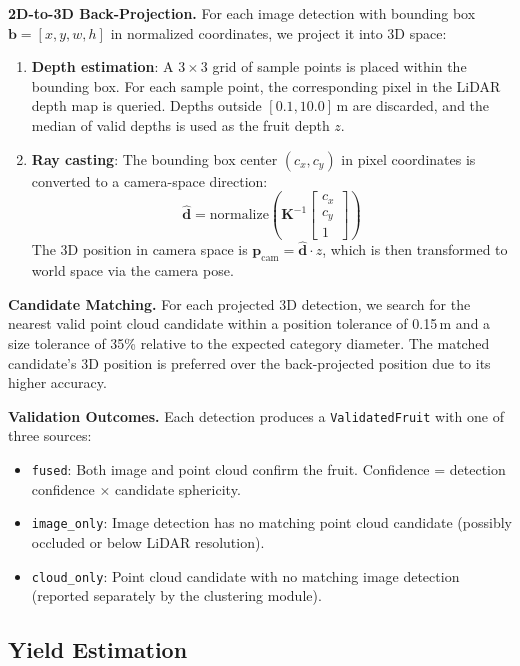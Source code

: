 \documentclass[article,final]{iclr2024_conference}
\begin{document}
\textbf{2D-to-3D Back-Projection.}
For each image detection with bounding box $\mathbf{b} = [x, y, w, h]$ in normalized coordinates, we project it into 3D space:
\begin{enumerate}[leftmargin=*,nosep]
    \item \textbf{Depth estimation}: A $3\times3$ grid of sample points is placed within the bounding box. For each sample point, the corresponding pixel in the LiDAR depth map is queried. Depths outside $[0.1, 10.0]$\,m are discarded, and the median of valid depths is used as the fruit depth $z$.
    \item \textbf{Ray casting}: The bounding box center $(c_x, c_y)$ in pixel coordinates is converted to a camera-space direction:
    \begin{equation}
    \hat{\mathbf{d}} = \text{normalize}\!\left(\mathbf{K}^{-1} \begin{bmatrix} c_x \\ c_y \\ 1 \end{bmatrix}\right)
    \end{equation}
    The 3D position in camera space is $\mathbf{p}_{\text{cam}} = \hat{\mathbf{d}} \cdot z$, which is then transformed to world space via the camera pose.
\end{enumerate}

\textbf{Candidate Matching.}
For each projected 3D detection, we search for the nearest valid point cloud candidate within a position tolerance of 0.15\,m and a size tolerance of 35\% relative to the expected category diameter. The matched candidate's 3D position is preferred over the back-projected position due to its higher accuracy.

\textbf{Validation Outcomes.}
Each detection produces a \texttt{ValidatedFruit} with one of three sources:
\begin{itemize}[leftmargin=*,nosep]
    \item \texttt{fused}: Both image and point cloud confirm the fruit. Confidence = detection confidence $\times$ candidate sphericity.
    \item \texttt{image\_only}: Image detection has no matching point cloud candidate (possibly occluded or below LiDAR resolution).
    \item \texttt{cloud\_only}: Point cloud candidate with no matching image detection (reported separately by the clustering module).
\end{itemize}

\subsection{Yield Estimation}
\label{sec:yield}
\end{document}
